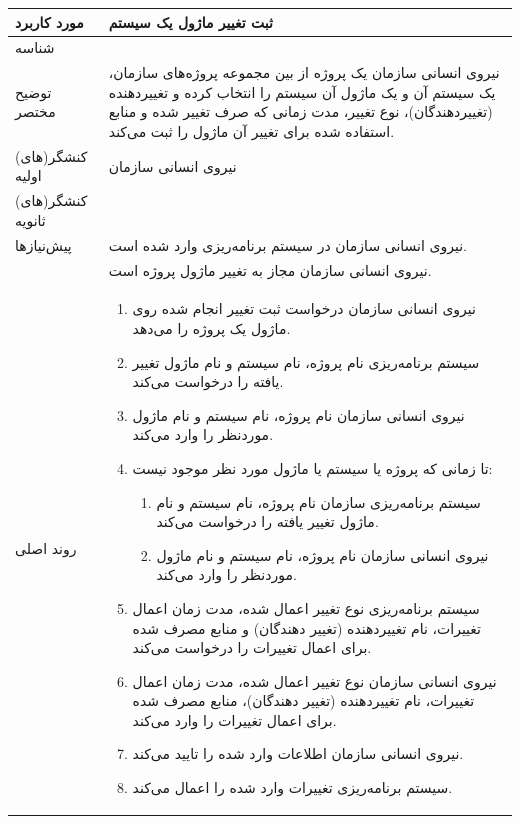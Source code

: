 \begin{table}[H]
	\centering
	\begin{tabular}{|p{3cm}|p{10cm}|}
		\hline
		
		
		مورد کاربرد	& ثبت تغییر ماژول یک سیستم  \\
		\hline
		
		شناسه & 
		\stepcounter{usecase_ID}
		
		\arabic{usecase_ID} \\
		
		\hline
		
		توضیح مختصر & نیروی انسانی سازمان یک پروژه از بین مجموعه پروژه‌های سازمان، یک سیستم آن و یک ماژول آن سیستم را انتخاب کرده و تغییردهنده (تغییردهندگان)، نوع تغییر، مدت زمانی که صرف تغییر شده و منابع استفاده شده برای تغییر آن ماژول را ثبت می‌کند. \\
		\hline
		
		کنشگر(های) اولیه & نیروی انسانی سازمان \\
		\hline
		
		کنشگر(های) ثانویه&  \\
		\hline
		
		پیش‌نیازها &
		نیروی انسانی سازمان در سیستم برنامه‌ریزی وارد شده است.\\
		& نیروی انسانی سازمان مجاز به تغییر ماژول پروژه است. \\
		\hline
		
		
		روند اصلی &
		\begin{enumerate}[topsep=0cm,leftmargin=0.5cm]
			\item نیروی انسانی سازمان درخواست  ثبت تغییر انجام شده روی ماژول یک پروژه را می‌دهد.
			\item سیستم برنامه‌ریزی نام پروژه، نام سیستم و نام ماژول تغییر یافته را درخواست می‌کند.
			\item نیروی انسانی سازمان نام پروژه، نام سیستم و نام ماژول موردنظر را وارد می‌کند.
			\item تا زمانی که پروژه یا سیستم یا ماژول مورد نظر موجود نیست:
			\begin{enumerate}[topsep=0cm,leftmargin=0.5cm]
				\item سیستم برنامه‌ریزی سازمان نام پروژه، نام سیستم و نام ماژول تغییر یافته را درخواست می‌کند.
				\item نیروی انسانی سازمان نام پروژه‌، نام سیستم و نام ماژول موردنظر را وارد می‌کند. 
			\end{enumerate}
			\item سیستم برنامه‌ریزی نوع تغییر اعمال شده، مدت زمان اعمال تغییرات، نام تغییردهنده (تغییر دهندگان) و منابع  مصرف شده برای اعمال تغییرات را درخواست می‌کند.
			\item نیروی انسانی سازمان نوع تغییر اعمال شده، مدت زمان اعمال تغییرات، نام تغییردهنده (تغییر دهندگان)، منابع  مصرف شده برای اعمال تغییرات را وارد می‌کند.
			\item نیروی انسانی سازمان اطلاعات وارد شده را تایید می‌کند.
			\item سیستم برنامه‌ریزی تغییرات وارد شده را اعمال می‌کند. 
		\end{enumerate}\\
		

\end{tabular}
\end{table}
